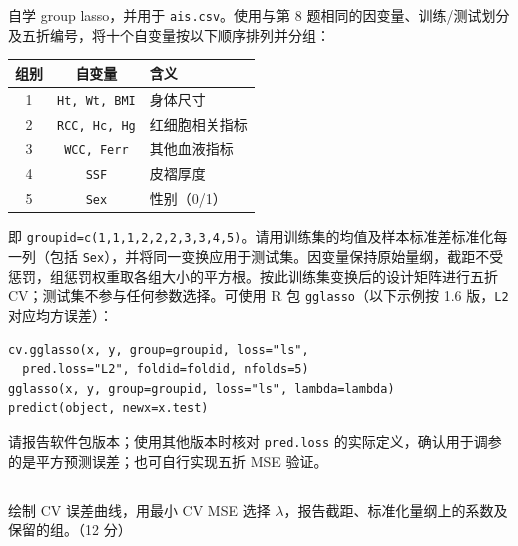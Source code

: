 \documentclass[12pt,a4paper]{article}
\begin{document}
自学 group lasso，并用于 \texttt{ais.csv}。使用与第 8 题相同的因变量、训练/测试划分及五折编号，将十个自变量按以下顺序排列并分组：
\begin{center}
\begin{tabular}{ccl}
\toprule
组别 & 自变量 & 含义 \\
\midrule
1 & \texttt{Ht, Wt, BMI} & 身体尺寸 \\
2 & \texttt{RCC, Hc, Hg} & 红细胞相关指标 \\
3 & \texttt{WCC, Ferr} & 其他血液指标 \\
4 & \texttt{SSF} & 皮褶厚度 \\
5 & \texttt{Sex} & 性别（0/1） \\
\bottomrule
\end{tabular}
\end{center}
即 \texttt{groupid=c(1,1,1,2,2,2,3,3,4,5)}。请用训练集的均值及样本标准差标准化每一列（包括 \texttt{Sex}），并将同一变换应用于测试集。因变量保持原始量纲，截距不受惩罚，组惩罚权重取各组大小的平方根。按此训练集变换后的设计矩阵进行五折 CV；测试集不参与任何参数选择。可使用 R 包 \texttt{gglasso}（以下示例按 1.6 版，\texttt{L2} 对应均方误差）：
\begin{lstlisting}[style=rcode]
cv.gglasso(x, y, group=groupid, loss="ls",
  pred.loss="L2", foldid=foldid, nfolds=5)
gglasso(x, y, group=groupid, loss="ls", lambda=lambda)
predict(object, newx=x.test)
\end{lstlisting}
请报告软件包版本；使用其他版本时核对 \texttt{pred.loss} 的实际定义，确认用于调参的是平方预测误差；也可自行实现五折 MSE 验证。

\subsection{}

绘制 CV 误差曲线，用最小 CV MSE 选择 $\lambda$，报告截距、标准化量纲上的系数及保留的组。（12 分）
\end{document}
